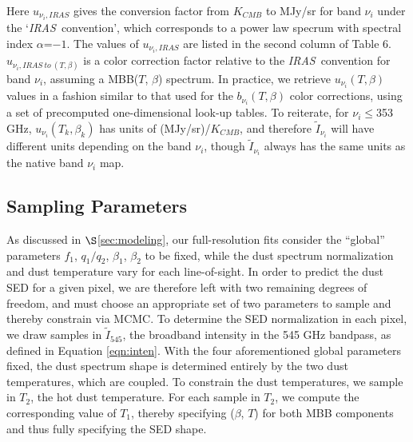 \documentclass{emulateapj}
\newcommand{\IRAS}{{\it IRAS}}
\begin{document}
Here $u_{\nu_i, IRAS}$ gives the conversion factor from $K_{CMB}$ to MJy/sr
for band $\nu_i$ under the `\IRAS~convention', which corresponds to
a power law specrum with spectral index $\alpha$=$-1$. The values of 
$u_{\nu_i, IRAS}$ are listed in the second column of \cite{planckresponse} 
Table 6. $u_{\nu_i, IRAS \ to \ (T, \beta)}$ is a color correction factor 
relative to the \IRAS~convention for band $\nu_i$, assuming a MBB($T$, $\beta$)
spectrum. In practice, we retrieve $u_{\nu_i}(T, \beta)$ values in a fashion 
similar to that used for the $b_{\nu_i}(T, \beta)$ color corrections, using a 
set of precomputed one-dimensional look-up tables. To reiterate, for 
$\nu_i$$\le$353 GHz, $u_{\nu_i}(T_k, \beta_k)$ has units of (MJy/sr)/$K_{CMB}$,
and therefore $\tilde{I}_{\nu_{i}}$ will have different units depending on the 
band $\nu_i$, though $\tilde{I}_{\nu_{i}}$ always has the same units as the 
native band $\nu_i$ map.




\subsection{Sampling Parameters}
\label{sec:samp}
As discussed in $\S$\ref{sec:modeling}, our full-resolution fits
consider the ``global'' parameters $f_1$, $q_1/q_2$, $\beta_1$, $\beta_2$ to be
 fixed, while the dust spectrum normalization and dust temperature vary for
each line-of-sight. In order to predict the dust SED for a given pixel, we are 
therefore left with two remaining degrees of freedom, and must choose an 
appropriate set of two parameters to sample and thereby constrain via MCMC. To 
determine the SED normalization in each pixel, we draw samples in 
$\tilde{I}_{545}$, the broadband intensity in the 545 GHz bandpass, as defined 
in Equation \ref{eqn:inten}. With the four aforementioned global parameters 
fixed, the dust spectrum shape is determined entirely by the two dust 
temperatures, which are coupled. To constrain the dust temperatures,
 we sample in $T_2$, the hot dust temperature. For each sample in $T_2$, we 
compute the corresponding value of $T_1$, thereby specifying ($\beta$, $T$) for
both MBB components and thus fully specifying the SED shape.
\end{document}
